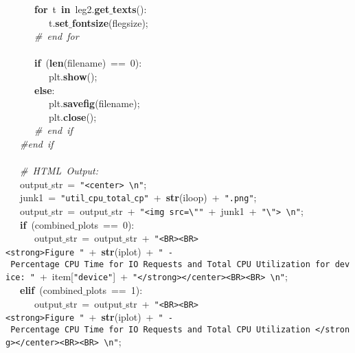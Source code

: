 \mbox{}\ \ \ \ \ \ \textbf{for}\ t\ \textbf{in}\ leg2.\textbf{get$\_$texts}(): \\
\mbox{}\ \ \ \ \ \ \ \ \ t.\textbf{set$\_$fontsize}(flegsize); \\
\mbox{}\ \ \ \ \ \ \textit{\#\ end\ for} \\
\mbox{}\ \ \ \ \ \  \\
\mbox{}\ \ \ \ \ \ \textbf{if}\ (\textbf{len}(filename)\ ==\ 0): \\
\mbox{}\ \ \ \ \ \ \ \ \ plt.\textbf{show}(); \\
\mbox{}\ \ \ \ \ \ \textbf{else}: \\
\mbox{}\ \ \ \ \ \ \ \ \ plt.\textbf{savefig}(filename); \\
\mbox{}\ \ \ \ \ \ \ \ \ plt.\textbf{close}(); \\
\mbox{}\ \ \ \ \ \ \textit{\#\ end\ if} \\
\mbox{}\ \ \ \textit{\#end\ if} \\
\mbox{}\ \ \  \\
\mbox{}\ \ \ \textit{\#\ HTML\ Output:} \\
\mbox{}\ \ \ output$\_$str\ =\ \texttt{"{}\textless{}center\textgreater{}\ \textbackslash{}n"{}}; \\
\mbox{}\ \ \ junk1\ =\ \texttt{"{}util$\_$cpu$\_$total$\_$cp"{}}\ +\ \textbf{str}(iloop)\ +\ \texttt{"{}.png"{}}; \\
\mbox{}\ \ \ output$\_$str\ =\ output$\_$str\ +\ \texttt{"{}\textless{}img\ src=\textbackslash{}"{}"{}}\ +\ junk1\ +\ \texttt{"{}\textbackslash{}"{}\textgreater{}\ \textbackslash{}n"{}}; \\
\mbox{}\ \ \ \textbf{if}\ (combined$\_$plots\ ==\ 0): \\
\mbox{}\ \ \ \ \ \ output$\_$str\ =\ output$\_$str\ +\ \texttt{"{}\textless{}BR\textgreater{}\textless{}BR\textgreater{}\textless{}strong\textgreater{}Figure\ "{}}\ +\ \textbf{str}(iplot)\ +\ \texttt{"{}\ -\ Percentage\ CPU\ Time\ for\ IO\ Requests\ and\ Total\ CPU\ Utilization\ for\ device:\ "{}}\ +\ item[\texttt{"{}device"{}}]\ +\ \texttt{"{}\textless{}/strong\textgreater{}\textless{}/center\textgreater{}\textless{}BR\textgreater{}\textless{}BR\textgreater{}\ \textbackslash{}n"{}}; \\
\mbox{}\ \ \ \textbf{elif}\ (combined$\_$plots\ ==\ 1): \\
\mbox{}\ \ \ \ \ \ output$\_$str\ =\ output$\_$str\ +\ \texttt{"{}\textless{}BR\textgreater{}\textless{}BR\textgreater{}\textless{}strong\textgreater{}Figure\ "{}}\ +\ \textbf{str}(iplot)\ +\ \texttt{"{}\ -\ Percentage\ CPU\ Time\ for\ IO\ Requests\ and\ Total\ CPU\ Utilization\ \textless{}/strong\textgreater{}\textless{}/center\textgreater{}\textless{}BR\textgreater{}\textless{}BR\textgreater{}\ \textbackslash{}n"{}}; \\
